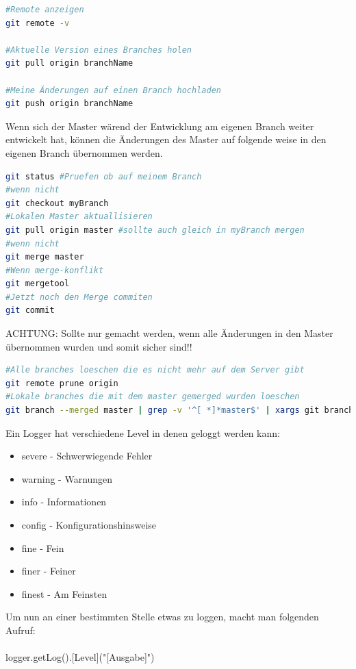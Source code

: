 \begin{lstlisting}[language=bash]
#Remote anzeigen
git remote -v

#Aktuelle Version eines Branches holen
git pull origin branchName

#Meine Änderungen auf einen Branch hochladen
git push origin branchName
\end{lstlisting}
\nsecend

Wenn sich der Master wärend der Entwicklung am eigenen Branch weiter entwickelt hat, können die Änderungen des Master auf folgende weise in den eigenen Branch übernommen werden.
\begin{lstlisting}[language=bash]
git status #Pruefen ob auf meinem Branch
#wenn nicht
git checkout myBranch
#Lokalen Master aktuallisieren
git pull origin master #sollte auch gleich in myBranch mergen
#wenn nicht
git merge master
#Wenn merge-konflikt
git mergetool
#Jetzt noch den Merge commiten
git commit
\end{lstlisting}
\nsecend

ACHTUNG: Sollte nur gemacht werden, wenn alle Änderungen in den Master übernommen wurden und somit sicher sind!!
\begin{lstlisting}[language=bash]
#Alle branches loeschen die es nicht mehr auf dem Server gibt
git remote prune origin
#Lokale branches die mit dem master gemerged wurden loeschen
git branch --merged master | grep -v '^[ *]*master$' | xargs git branch -d
\end{lstlisting}

\nsecend

\nsecend %

Ein Logger hat verschiedene Level in denen geloggt werden kann:
\begin{itemize}
\item severe	- Schwerwiegende Fehler
\item warning	- Warnungen
\item info	- Informationen
\item config	- Konfigurationshinsweise
\item fine	- Fein
\item finer	- Feiner
\item finest	- Am Feinsten
\end{itemize}
Um nun an einer bestimmten Stelle etwas zu loggen, macht man folgenden Aufruf: \\ \\
logger.getLog().[Level]("[Ausgabe]")\\

